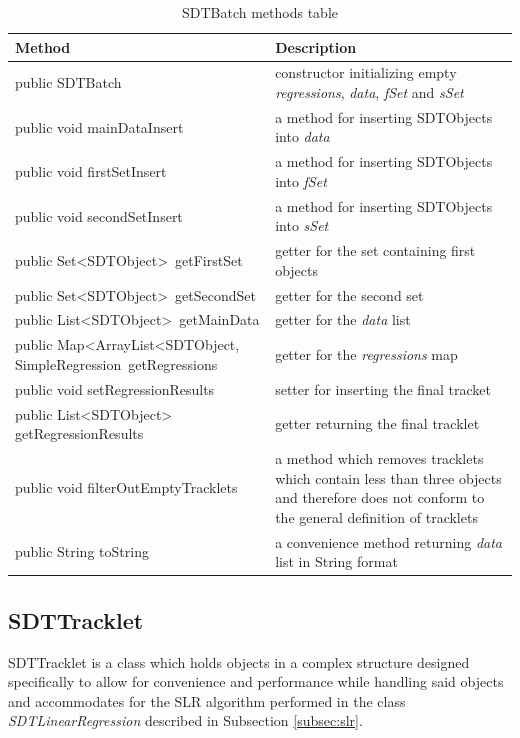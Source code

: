 \begin{table}[H]
\centering
\setlength{\extrarowheight}{2pt}
\begin{tabularx}{\textwidth}{|X|X|}
\hline
\textbf{Method} & \textbf{Description} \\ \hline
public \mbox{SDTBatch} & constructor initializing empty \emph{regressions}, \emph{data}, \emph{fSet} and \emph{sSet} \\ \hline
public void \mbox{mainDataInsert} & a method for inserting \mbox{SDTObjects} into \emph{data} \\ \hline
public void \mbox{firstSetInsert} & a method for inserting \mbox{SDTObjects} into \emph{fSet} \\ \hline
public void \mbox{secondSetInsert} & a method for inserting \mbox{SDTObjects} into \emph{sSet} \\ \hline
public \mbox{Set<SDTObject> getFirstSet} & getter for the set containing first objects \\ \hline
public \mbox{Set<SDTObject> getSecondSet} & getter for the second set \\ \hline
public \mbox{List<SDTObject> getMainData} & getter for the \emph{data} list \\ \hline
public \mbox{Map<ArrayList<SDTObject,} \mbox{SimpleRegression getRegressions} & getter for the \emph{regressions} map \\ \hline
public void \mbox{setRegressionResults} & setter for inserting the final tracket \\ \hline
public \mbox{List<SDTObject>} \mbox{getRegressionResults} & getter returning the final tracklet \\ \hline
public void \mbox{filterOutEmptyTracklets} & a method which removes tracklets which contain less than three objects and therefore does not conform to the general definition of tracklets \\ \hline
public String \mbox{toString} & a convenience method returning \emph{data} list in String format \\ \hline
\end{tabularx}
\caption{SDTBatch methods table}
\label{tab:class_methods_B}
\end{table}

\newpage

\subsection{SDTTracklet}\label{subsec:tracklet}

	SDTTracklet is a class which holds objects in a complex structure designed specifically to allow for convenience and performance while handling said objects and accommodates for the SLR algorithm performed in the class \emph{SDTLinearRegression} described in Subsection \ref{subsec:slr}.
	
